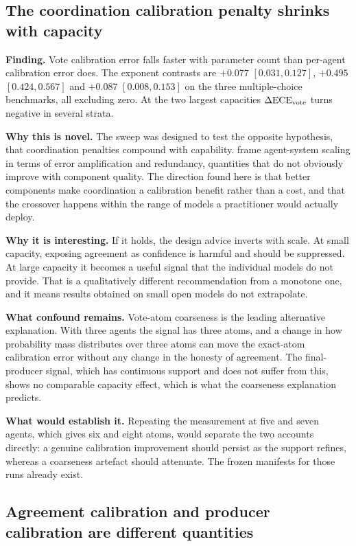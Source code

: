 \subsection{The coordination calibration penalty shrinks with capacity}

\textbf{Finding.} Vote calibration error falls faster with parameter count than per-agent
calibration error does. The exponent contrasts are $+0.077$ $[0.031, 0.127]$, $+0.495$
$[0.424, 0.567]$ and $+0.087$ $[0.008, 0.153]$ on the three multiple-choice benchmarks,
all excluding zero. At the two largest capacities $\Delta\mathrm{ECE}_{\mathrm{vote}}$ turns negative in several
strata.

\textbf{Why this is novel.} The sweep was designed to test the opposite hypothesis, that
coordination penalties compound with capability. \citet{kim2025scaling} frame agent-system
scaling in terms of error amplification and redundancy, quantities that do not obviously
improve with component quality. The direction found here is that better components make
coordination a calibration benefit rather than a cost, and that the crossover happens
within the range of models a practitioner would actually deploy.

\textbf{Why it is interesting.} If it holds, the design advice inverts with scale. At small
capacity, exposing agreement as confidence is harmful and should be suppressed. At large
capacity it becomes a useful signal that the individual models do not provide. That is a
qualitatively different recommendation from a monotone one, and it means results obtained
on small open models do not extrapolate.

\textbf{What confound remains.} Vote-atom coarseness is the leading alternative
explanation. With three agents the signal has three atoms, and a change in how probability
mass distributes over three atoms can move the exact-atom calibration error without any
change in the honesty of agreement. The final-producer signal, which has continuous support
and does not suffer from this, shows no comparable capacity effect, which is what the
coarseness explanation predicts.

\textbf{What would establish it.} Repeating the measurement at five and seven agents, which
gives six and eight atoms, would separate the two accounts directly: a genuine calibration
improvement should persist as the support refines, whereas a coarseness artefact should
attenuate. The frozen manifests for those runs already exist.

\subsection{Agreement calibration and producer calibration are different quantities}

